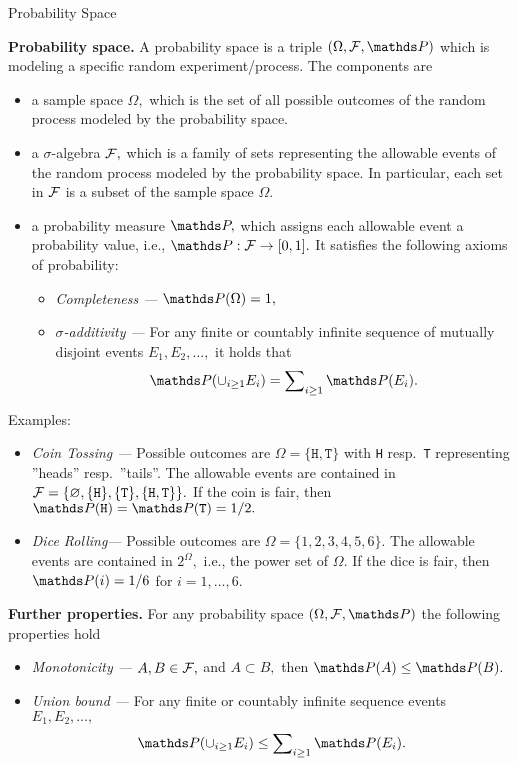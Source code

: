 \documentclass[11pt,compress,t,notes=noshow, xcolor=table]{beamer}
\begin{document}
\begin{vbframe}{Probability Space}
	
	\textbf{Probability space.} A probability space is a triple $(\Omega,\F,\P)$ which is modeling a specific random experiment/process.
		The components are
		\begin{itemize}
			\item a sample space $\Omega,$ which is the set of all possible outcomes of the random process modeled by the probability space.
			\item a $\sigma$-algebra $\mathcal{F},$ which is a family of sets representing the allowable events of the random process modeled by the probability space.
			In particular, each set in $\mathcal{F}$ is a subset of the sample space $\Omega.$
			\item a probability measure $\P,$ which assigns each allowable event a probability value, i.e., $\P:\F\to[0,1].$ It satisfies the following axioms of probability:
			\begin{itemize}
				\item  \emph{Completeness ---} $\P(\Omega)=1,$  
				\item  \emph{$\sigma$-additivity ---} For any finite or countably infinite sequence of mutually disjoint events $E_1,E_2,\ldots,$ it holds that
				$$\P(\cup_{i\geq1}  E_i) = \sum\nolimits_{i\geq 1} \P(E_i).$$
			\end{itemize}
		\end{itemize}
		\framebreak
		Examples:
		\begin{itemize}
			\item \emph{Coin Tossing ---} Possible outcomes are $\Omega=\{\texttt{H},\texttt{T} \}$ with \texttt{H} resp.\ \texttt{T} representing ''heads'' resp.\ ''tails''. The allowable events are contained in $\mathcal{F}=\{\varnothing,  \{\texttt{H}\} , \{\texttt{T}\}, \{\texttt{H},\texttt{T}\}  \}.$ If the coin is fair, then $\P(\texttt{H})=\P(\texttt{T})=1/2.$
			\item \emph{Dice Rolling---} Possible outcomes are $\Omega=\{1,2,3,4,5,6\}.$  The allowable events are contained in $2^\Omega,$ i.e., the power set of $\Omega.$
			If the dice is fair, then $\P(i)=1/6$ for $i=1,\ldots,6.$
		\end{itemize}
		\textbf{Further properties.} For any probability space $(\Omega,\F,\P)$ the following properties hold
		\begin{itemize}
			\item \emph{Monotonicity ---} $A,B\in \mathcal{F},$ and $A\subset B,$ then $\P(A)\leq \P(B).$
			\item \emph{Union bound ---}  For any finite or countably infinite sequence events $E_1,E_2,\ldots,$ 
			$$\P(\cup_{i\geq1}  E_i) \leq \sum\nolimits_{i\geq 1} \P(E_i).$$
		\end{itemize}

\end{vbframe}
\end{document}
